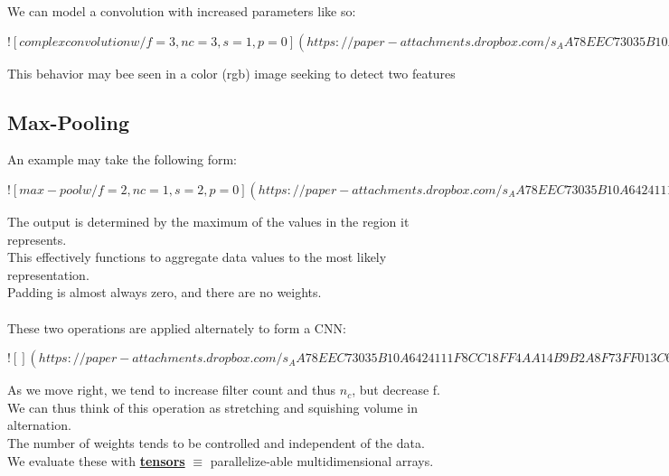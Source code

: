 \documentclass[../../lecture_notes.tex]{subfiles}
\begin{document}
\noindent We can model a convolution with increased parameters like so:

\newpage
$![complex convolution w/ f=3, nc = 3, s = 1, p = 0](https://paper-attachments.dropbox.com/s_AA78EEC73035B10A6424111F8CC18FF4AA14B9B2A8F73FF013C6765837E92F61_1591303830548_Untitled+drawing+2.jpg)$
\newpage

\noindent This behavior may bee seen in a color (rgb) image seeking to detect two features

\subsection*{Max-Pooling}
\noindent An example may take the following form:

\newpage
$![max-pool w/ f = 2, nc = 1, s = 2, p = 0](https://paper-attachments.dropbox.com/s_AA78EEC73035B10A6424111F8CC18FF4AA14B9B2A8F73FF013C6765837E92F61_1591304109912_Untitled+drawing+3.jpg)$
\newpage

\noindent The output is determined by the maximum of the values in the region it represents.\\
This effectively functions to aggregate data values to the most likely representation.\\
Padding is almost always zero, and there are no weights.\\
\\
These two operations are applied alternately to form a CNN:

\newpage
$![](https://paper-attachments.dropbox.com/s_AA78EEC73035B10A6424111F8CC18FF4AA14B9B2A8F73FF013C6765837E92F61_1591304763546_Untitled+drawing+4.jpg)$
\newpage

\noindent As we move right, we tend to increase filter count and thus $n_c$, but decrease f.\\
We can thus think of this operation as stretching and squishing volume in alternation.\\
The number of weights tends to be controlled and independent of the data.\\
We evaluate these with \textbf{\underline{tensors}} $\equiv$ parallelize-able multidimensional arrays.\\
\end{document}
